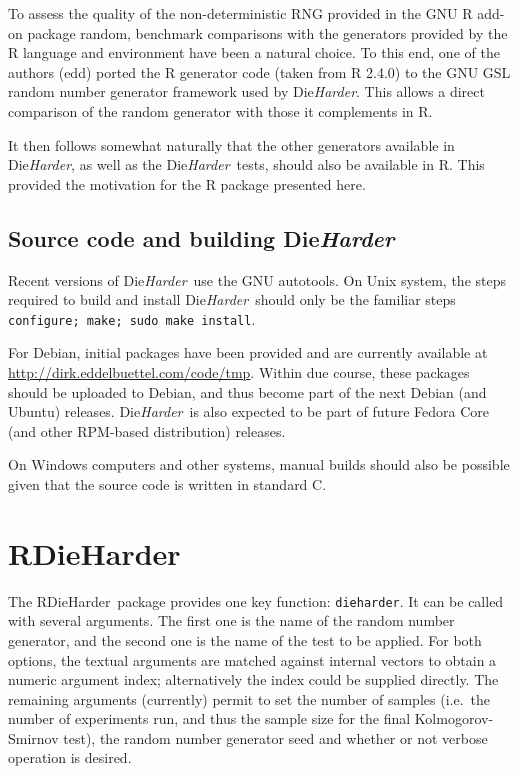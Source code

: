 \documentclass[12pt]{article}
\newcommand{\pkg}[1]{{\normalfont\fontseries{b}\selectfont #1}}
\newcommand{\dieharder}{\textrm{Die}\textsl{Harder}}
\newcommand{\rdieharder}{\pkg{RDieHarder}}
\begin{document}
To assess the quality of the non-deterministic RNG provided in the GNU R
add-on package \pkg{random}, benchmark comparisons with the generators
provided by the R language and environment have been a natural choice. To
this end, one of the authors (edd) ported the R generator code (taken from R
2.4.0) to the GNU GSL random number generator framework used by \dieharder.
This allows a direct comparison of the \pkg{random} generator with those it
complements in R.

It then follows somewhat naturally that the other generators available in
\dieharder, as well as the \dieharder\ tests, should also be available in R.
This provided the motivation for the R package presented here.

\subsection{Source code and building \dieharder} 

Recent versions of \dieharder\ use the GNU autotools. On Unix system,
the steps required to build and install \dieharder\ should only be the familiar
steps \texttt{configure; make; sudo make install}. 

For Debian, initial packages have been provided and are currently available
at \url{http://dirk.eddelbuettel.com/code/tmp}.  Within due course, these
packages should be uploaded to Debian, and thus become part of the next
Debian (and Ubuntu) releases.  \dieharder\ is also expected to be part of
future Fedora Core (and other RPM-based distribution) releases.

On Windows computers and other systems, manual builds should also be possible
given that the source code is written in standard C. 

\section{\rdieharder}

The \rdieharder\ package provides one key function: \texttt{dieharder}.  It can
be called with several arguments. The first one is the name of the random
number generator, and the second one is the name of the test to be applied.
For both options, the textual arguments are matched against internal vectors
to obtain a numeric argument index; alternatively the index could be supplied
directly. The remaining arguments (currently) permit to set the number of
samples (i.e.~the number of experiments run, and thus the sample size for the
final Kolmogorov-Smirnov test), the random number generator seed and whether
or not verbose operation is desired.
\end{document}
